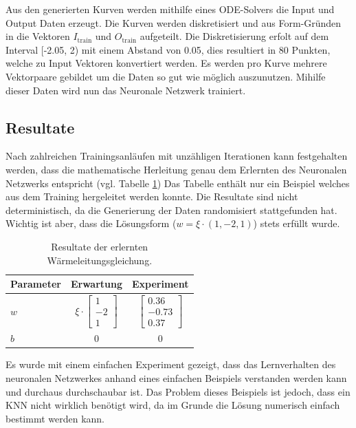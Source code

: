 Aus den generierten Kurven werden mithilfe eines ODE-Solvers die Input und Output Daten erzeugt. Die Kurven werden diskretisiert und aus Form-Gründen in die Vektoren $I_{\text{train}}$ und $O_{\text{train}}$ aufgeteilt. Die Diskretisierung erfolt auf dem Interval [-2.05, 2) mit einem Abstand von 0.05, dies resultiert in 80 Punkten, welche zu Input Vektoren konvertiert werden. Es werden pro Kurve mehrere Vektorpaare gebildet um die Daten so gut wie möglich auszunutzen. Mihilfe dieser Daten wird nun das Neuronale Netzwerk trainiert.

\subsection{Resultate}
Nach zahlreichen Trainingsanläufen mit unzähligen Iterationen kann festgehalten werden, dass die mathematische Herleitung genau dem Erlernten des Neuronalen Netzwerks entspricht (vgl. Tabelle \ref{tbl:result_heat}) Das Tabelle enthält nur ein Beispiel welches aus dem Training hergeleitet werden konnte. Die Resultate sind nicht deterministisch, da die Generierung der Daten randomisiert stattgefunden hat. Wichtig ist aber, dass die Lösungsform ($w = \xi \cdot (1, -2, 1)$) stets erfüllt wurde.

\begin{table}
	\centering
	\def\arraystretch{1.1}
	\begin{tabular}{l|c|c}
		Parameter & Erwartung & Experiment \\
		\hline
		$w$ & $\xi \cdot \begin{bmatrix} 1 \\ -2 \\ 1 \end{bmatrix}$ & $\begin{bmatrix} 0.36 \\ -0.73 \\ 0.37 \end{bmatrix}$ \\
		$b$ & 0 & 0 \\
	\end{tabular}
	\label{tbl:result_heat}
	\caption{Resultate der erlernten Wärmeleitungsgleichung.}
\end{table}

Es wurde mit einem einfachen Experiment gezeigt, dass das Lernverhalten des neuronalen Netzwerkes anhand eines einfachen Beispiels verstanden werden kann und durchaus durchschaubar ist. Das Problem dieses Beispiels ist jedoch, dass ein KNN nicht wirklich benötigt wird, da im Grunde die Lösung numerisch einfach bestimmt werden kann.
